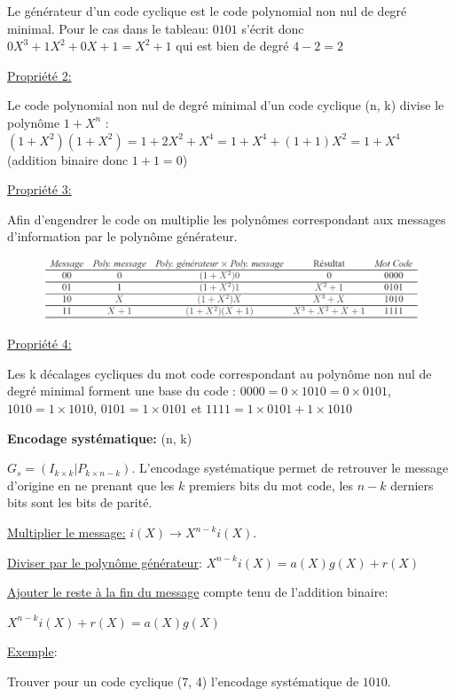 Le générateur d'un code cyclique est le code polynomial non nul de
degré minimal. Pour le cas dans le tableau: $0101$ s'écrit donc $0X^3 + 1X^2 + 0X + 1 =X^2+1$
qui est bien de degré $4-2 = 2$

\underline{Propriété 2:}

Le code polynomial non nul de degré minimal d'un code cyclique
(n, k) divise le polynôme $1 + X^n$ : $(1 + X^2)(1 + X^2) = 1 + 2X^2 + X^4 = 1 + X^4 + (1 + 1)X^2 = 1 + X^4$
(addition binaire donc $1+1=0$)

\columnbreak

\underline{Propriété 3:}

Afin d'engendrer le code on multiplie les polynômes correspondant
aux messages d'information par le polynôme générateur.

\setlength{\intextsep}{-2pt}
\begin{figure}[H]
    \includegraphics[width=\linewidth]{images/generer_code_cyclique.png}
\end{figure}

\underline{Propriété 4:}

Les k décalages cycliques du mot code correspondant au polynôme
non nul de degré minimal forment une base du code :
$0000 = 0 \times 1010 = 0 \times 0101$, $1010 = 1 \times 1010$, $0101 = 1 \times 0101$ et
$1111 = 1 \times 0101 + 1 \times 1010$

\textbf{Encodage systématique:} (n, k)

$G_s = (I_{k\times k}|P_{k\times n-k})$.
L'encodage systématique permet de retrouver le message d'origine en ne prenant que les
$k$ premiers bits du mot code, les $n-k$ derniers bits sont les bits de parité.

\underline{Multiplier le message:} $i(X)\rightarrow X^{n-k}i(X)$.

\underline{Diviser par le polynôme générateur}: $X^{n-k}i(X)=a(X)g(X)+r(X)$

\underline{Ajouter le reste à la fin du message} compte tenu de l'addition binaire:

$X^{n-k}i(X)+r(X)=a(X)g(X)$

\underline{Exemple}:

Trouver pour un code cyclique (7, 4) l’encodage systématique de $1010$.

